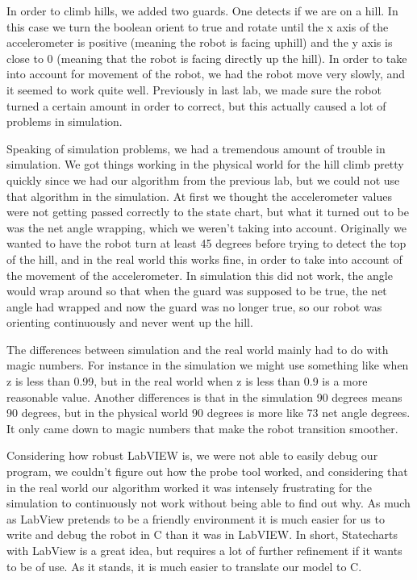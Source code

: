 \documentclass[10pt,titlepage]{article}
\begin{document}
    In order to climb hills, we added two guards. One detects if we are on a hill. In this case we turn the boolean orient to true and rotate until the x axis of the accelerometer is positive (meaning the robot is facing uphill) and the y axis is close to 0 (meaning that the robot is facing directly up the hill). In order to take into account for movement of the robot, we had the robot move very slowly, and it seemed to work quite well. Previously in last lab, we made sure the robot turned a certain amount in order to correct, but this actually caused a lot of problems in simulation.


    Speaking of simulation problems, we had a tremendous amount of trouble in simulation. We got things working in the physical world for the hill climb pretty quickly since we had our algorithm from the previous lab, but we could not use that algorithm in the simulation. At first we thought the accelerometer values were not getting passed correctly to the state chart, but what it turned out to be was the net angle wrapping, which we weren't taking into account. Originally we wanted to have the robot turn at least 45 degrees before trying to detect the top of the hill, and in the real world this works fine, in order to take into account of the movement of the accelerometer. In simulation this did not work, the angle would wrap around so that when the guard was supposed to be true, the net angle had wrapped and now the guard was no longer true, so our robot was orienting continuously and never went up the hill.

    The differences between simulation and the real world mainly had to do with magic numbers. For instance in the simulation we might use something like when z is less than 0.99, but in the real world when z is less than 0.9 is a more reasonable value. Another differences is that in the simulation 90 degrees means 90 degrees, but in the physical world 90 degrees is more like 73 net angle degrees. It only came down to magic numbers that make the robot transition smoother.

    Considering how robust LabVIEW is, we were not able to easily debug our program, we couldn't figure out how the probe tool worked, and considering that in the real world our algorithm worked it was intensely frustrating for the simulation to continuously not work without being able to find out why. As much as LabView pretends to be a friendly environment it is much easier for us to write and debug the robot in C than it was in LabVIEW. In short, Statecharts with LabView is a great idea, but requires a lot of further refinement if it wants to be of use. As it stands, it is much easier to translate our model to C.
\end{document}
